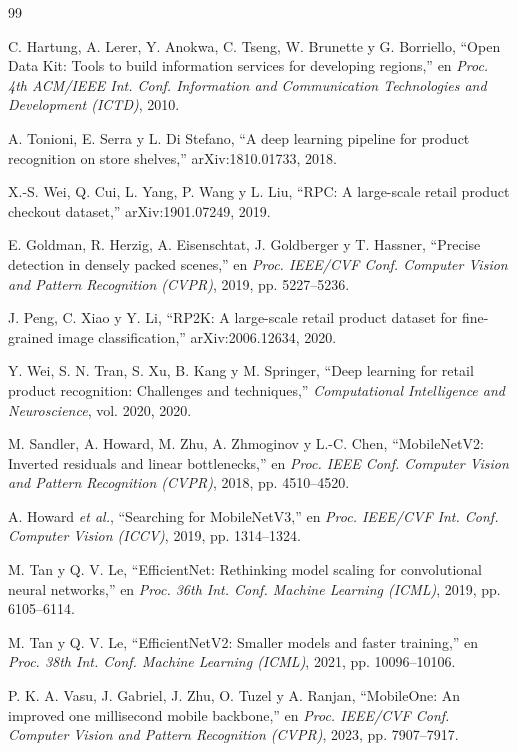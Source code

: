 \documentclass[conference]{IEEEtran}
\begin{document}
\begin{thebibliography}{99}

 C. Hartung, A. Lerer, Y. Anokwa, C. Tseng, W. Brunette y G. Borriello, ``Open Data Kit:
Tools to build information services for developing regions,'' en \emph{Proc. 4th ACM/IEEE Int. Conf. Information
and Communication Technologies and Development (ICTD)}, 2010.

 A. Tonioni, E. Serra y L. Di Stefano, ``A deep learning pipeline for product recognition on
store shelves,'' arXiv:1810.01733, 2018.

 X.-S. Wei, Q. Cui, L. Yang, P. Wang y L. Liu, ``RPC: A large-scale retail product checkout
dataset,'' arXiv:1901.07249, 2019.

 E. Goldman, R. Herzig, A. Eisenschtat, J. Goldberger y T. Hassner, ``Precise detection in
densely packed scenes,'' en \emph{Proc. IEEE/CVF Conf. Computer Vision and Pattern Recognition (CVPR)}, 2019,
pp. 5227--5236.

 J. Peng, C. Xiao y Y. Li, ``RP2K: A large-scale retail product dataset for fine-grained
image classification,'' arXiv:2006.12634, 2020.

 Y. Wei, S. N. Tran, S. Xu, B. Kang y M. Springer, ``Deep learning for retail product
recognition: Challenges and techniques,'' \emph{Computational Intelligence and Neuroscience}, vol. 2020, 2020.

 M. Sandler, A. Howard, M. Zhu, A. Zhmoginov y L.-C. Chen, ``MobileNetV2: Inverted residuals
and linear bottlenecks,'' en \emph{Proc. IEEE Conf. Computer Vision and Pattern Recognition (CVPR)}, 2018,
pp. 4510--4520.

 A. Howard \emph{et al.}, ``Searching for MobileNetV3,'' en \emph{Proc. IEEE/CVF Int. Conf.
Computer Vision (ICCV)}, 2019, pp. 1314--1324.

 M. Tan y Q. V. Le, ``EfficientNet: Rethinking model scaling for convolutional neural
networks,'' en \emph{Proc. 36th Int. Conf. Machine Learning (ICML)}, 2019, pp. 6105--6114.

 M. Tan y Q. V. Le, ``EfficientNetV2: Smaller models and faster training,'' en \emph{Proc. 38th
Int. Conf. Machine Learning (ICML)}, 2021, pp. 10096--10106.

 P. K. A. Vasu, J. Gabriel, J. Zhu, O. Tuzel y A. Ranjan, ``MobileOne: An improved one
millisecond mobile backbone,'' en \emph{Proc. IEEE/CVF Conf. Computer Vision and Pattern Recognition (CVPR)},
2023, pp. 7907--7917.


\end{thebibliography}
\end{document}
